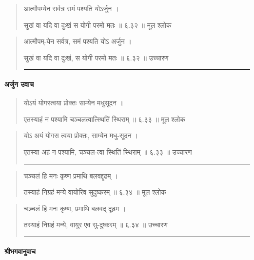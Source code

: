 \begin{quotation}  

आत्मौपम्येन सर्वत्र समं पश्यति योऽर्जुन  ।  

सुखं वा यदि वा दुःखं स योगी परमो मतः  ॥ ६.३२ ॥  मूल श्लोक
\end{quotation}

\begin{quotation}

आत्मौपम्-येन सर्वत्र, समं पश्यति योऽ अर्जुन  ।  

सुखं वा यदि वा दुःखं, स योगी परमो मतः  ॥ ६.३२ ॥  उच्चारण

\noindent\rule{16cm}{0.4pt} 
\end{quotation}


\paragraph{\sanskrit अर्जुन उवाच}
\begin{quotation}  



योऽयं योगस्त्वया प्रोक्तः साम्येन मधुसूदन  ।  

एतस्याहं न पश्यामि चञ्चलत्वात्स्थितिं स्थिराम्‌  ॥ ६.३३ ॥  मूल श्लोक
\end{quotation}

\begin{quotation}

योऽ अयं योगस त्वया प्रोक्तः, साम्येन मधु-सूदन  ।  

एतस्या अहं न पश्यामि, चञ्चल-त्वा स्थितिं स्थिराम्‌  ॥ ६.३३ ॥  उच्चारण

\noindent\rule{16cm}{0.4pt} 
\end{quotation}


\begin{quotation}  

चञ्चलं हि मनः कृष्ण प्रमाथि बलवद्दृढम्‌  ।  

तस्याहं निग्रहं मन्ये वायोरिव सुदुष्करम्‌  ॥ ६.३४ ॥  मूल श्लोक
\end{quotation}

\begin{quotation}

चञ्चलं हि मनः कृष्ण, प्रमाथि बलवद् दृढ़म   ।  

तस्याहं निग्रहं मन्ये, वायुर एव सु-दुष्करम्‌  ॥ ६.३४ ॥  उच्चारण

\noindent\rule{16cm}{0.4pt} 
\end{quotation}

\paragraph{\sanskrit श्रीभगवानुवाच}

